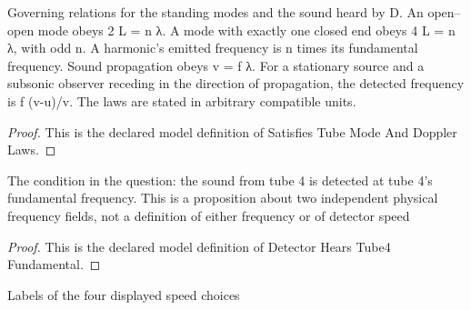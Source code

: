 \begin{definition}
  \label{def:physics:phyx-mini-0320:phyxminiproblems-problemphyxmini0320-satisfiestubemodeanddopplerlaws}
  Governing relations for the standing modes and the sound heard by D. An open--open mode obeys 2 L = n λ. A mode with exactly one closed end obeys 4 L = n λ, with odd n. A harmonic's emitted frequency is n times its fundamental frequency. Sound propagation obeys v = f λ. For a stationary source and a subsonic observer receding in the direction of propagation, the detected frequency is f (v-u)/v. The laws are stated in arbitrary compatible units.
\end{definition}
\begin{proof}
  This is the declared model definition of Satisfies Tube Mode And Doppler Laws.
\end{proof}
\begin{definition}
  \label{def:physics:phyx-mini-0320:phyxminiproblems-problemphyxmini0320-detectorhearstube4fundamental}
  The condition in the question: the sound from tube 4 is detected at tube 4's fundamental frequency. This is a proposition about two independent physical frequency fields, not a definition of either frequency or of detector speed
\end{definition}
\begin{proof}
  This is the declared model definition of Detector Hears Tube4 Fundamental.
\end{proof}
\begin{definition}
  \label{def:physics:phyx-mini-0320:phyxminiproblems-problemphyxmini0320-answerchoice}
  Labels of the four displayed speed choices
\end{definition}
